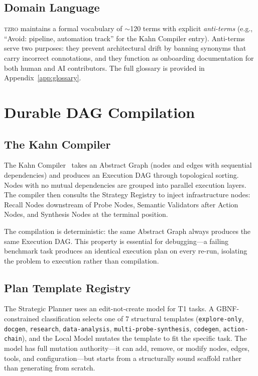 \documentclass{article}
\begin{document}
\subsection{Domain Language}

\textsc{tzro} maintains a formal vocabulary of $\sim$120 terms with explicit \emph{anti-terms} (e.g., ``Avoid: pipeline, automation track'' for the Kahn Compiler entry).
Anti-terms serve two purposes: they prevent architectural drift by banning synonyms that carry incorrect connotations, and they function as onboarding documentation for both human and AI contributors.
The full glossary is provided in Appendix~\ref{app:glossary}.

\section{Durable DAG Compilation}
\label{sec:dag_compilation}

\subsection{The Kahn Compiler}
\label{sec:kahn_compiler}

The Kahn Compiler~\cite{kahn1962} takes an Abstract Graph (nodes and edges with sequential dependencies) and produces an Execution DAG through topological sorting.
Nodes with no mutual dependencies are grouped into parallel execution layers.
The compiler then consults the Strategy Registry to inject infrastructure nodes: Recall Nodes downstream of Probe Nodes, Semantic Validators after Action Nodes, and Synthesis Nodes at the terminal position.

The compilation is deterministic: the same Abstract Graph always produces the same Execution DAG.
This property is essential for debugging---a failing benchmark task produces an identical execution plan on every re-run, isolating the problem to execution rather than compilation.

\subsection{Plan Template Registry}
\label{sec:plan_templates}

The Strategic Planner uses an edit-not-create model for T1 tasks.
A GBNF-constrained classification selects one of 7 structural templates (\texttt{explore-only}, \texttt{docgen}, \texttt{research}, \texttt{data-analysis}, \texttt{multi-probe-synthesis}, \texttt{codegen}, \texttt{action-chain}), and the Local Model mutates the template to fit the specific task.
The model has full mutation authority---it can add, remove, or modify nodes, edges, tools, and configuration---but starts from a structurally sound scaffold rather than generating from scratch.
\end{document}
